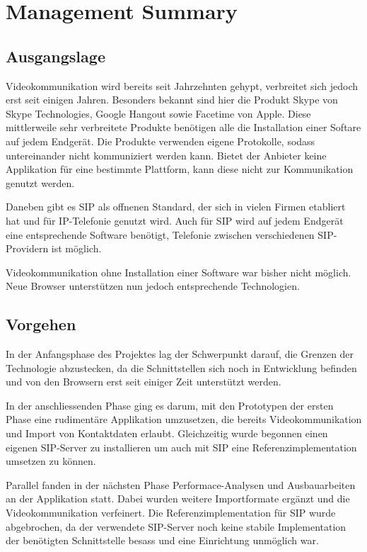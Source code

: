 \chapter{Management Summary}

\section{Ausgangslage}
Videokommunikation wird bereits seit Jahrzehnten gehypt, verbreitet sich jedoch erst seit einigen Jahren. 
Besonders bekannt sind hier die Produkt Skype von Skype Technologies, Google Hangout sowie Facetime von Apple.
Diese mittlerweile sehr verbreitete Produkte benötigen alle die Installation einer Softare auf jedem Endgerät. Die Produkte verwenden eigene Protokolle, sodass untereinander nicht kommuniziert werden kann. Bietet der Anbieter keine Applikation für eine bestimmte Plattform, kann diese nicht zur Kommunikation genutzt werden.

Daneben gibt es SIP als offnenen Standard, der sich in vielen Firmen etabliert hat und für IP-Telefonie genutzt wird. Auch für SIP wird auf jedem Endgerät eine entsprechende Software benötigt, Telefonie zwischen verschiedenen SIP-Providern ist möglich.

Videokommunikation ohne Installation einer Software war bisher nicht möglich. Neue Browser unterstützen nun jedoch entsprechende Technologien.


\section{Vorgehen}
In der Anfangsphase des Projektes lag der Schwerpunkt darauf, die Grenzen der Technologie abzustecken, da die Schnittstellen sich noch in Entwicklung befinden und von den Browsern erst seit einiger Zeit unterstützt werden.

In der anschliessenden Phase ging es darum, mit den Prototypen der ersten Phase eine rudimentäre Applikation umzusetzen, die bereits Videokommunikation und Import von Kontaktdaten erlaubt. Gleichzeitig wurde begonnen einen eigenen SIP-Server zu installieren um auch mit SIP eine Referenzimplementation umsetzen zu können.

Parallel fanden in der nächsten Phase Performace-Analysen und Ausbauarbeiten an der Applikation statt. Dabei wurden weitere Importformate ergänzt und die Videokommunikation verfeinert.
Die Referenzimplementation für SIP wurde abgebrochen, da der verwendete SIP-Server noch keine stabile Implementation der benötigten Schnittstelle besass und eine Einrichtung unmöglich war.

